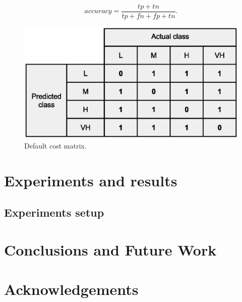 \documentclass{llncs}
\begin{document}
	\begin{equation}
		\textit{accuracy} =\frac{tp + tn}{tp + fn + fp + tn}.
		\label{equation:acc}
	\end{equation}

\begin{figure}[ht]
\begin{center}
\includegraphics[scale=0.40]{Confusion-matrix-multiclass-default}
\end{center}
\caption{Default cost matrix.}
\label{fig:count}
\end{figure}





\section{Experiments and results}

\subsection{Experiments setup}

\section{Conclusions and Future Work}
\label{sec:conclusionsAndFutureWork}





\section*{Acknowledgements}






\end{document}
